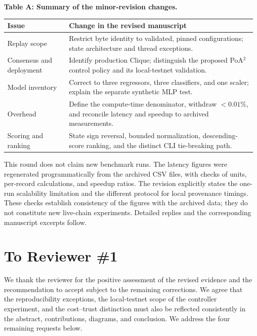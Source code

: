\documentclass[11pt]{article}
\begin{document}
\begin{center}
\textbf{Table A: Summary of the minor-revision changes.}\par\smallskip
\small
\begin{tabular}{@{}p{2.7cm}p{11.9cm}@{}}
\toprule
Issue & Change in the revised manuscript \\
\midrule
Replay scope & Restrict byte identity to validated, pinned configurations; state architecture and thread exceptions. \\
\addlinespace
Consensus and deployment & Identify production Clique; distinguish the proposed PoA$^2$ control policy and its local-testnet validation. \\
\addlinespace
Model inventory & Correct to three regressors, three classifiers, and one scaler; explain the separate synthetic MLP test. \\
\addlinespace
Overhead & Define the compute-time denominator, withdraw $<0.01\%$, and reconcile latency and speedup to archived measurements. \\
\addlinespace
Scoring and ranking & State sign reversal, bounded normalization, descending-score ranking, and the distinct CLI tie-breaking path. \\
\bottomrule
\end{tabular}
\end{center}

This round does not claim new benchmark runs. The latency figures were
regenerated programmatically from the archived CSV files, with checks of
units, per-record calculations, and speedup ratios. The revision explicitly
states the one-run scalability limitation and the different protocol for
local provenance timings. These checks establish consistency of the figures
with the archived data; they do not constitute new live-chain experiments.
Detailed replies and the corresponding manuscript excerpts follow.

\clearpage
\section*{To Reviewer \#1}
We thank the reviewer for the positive assessment of the revised evidence
and the recommendation to accept subject to the remaining corrections.
We agree that the reproducibility exceptions, the local-testnet scope of
the controller experiment, and the cost--trust distinction must also be
reflected consistently in the abstract, contributions, diagrams, and
conclusion. We address the four remaining requests below.
\end{document}
